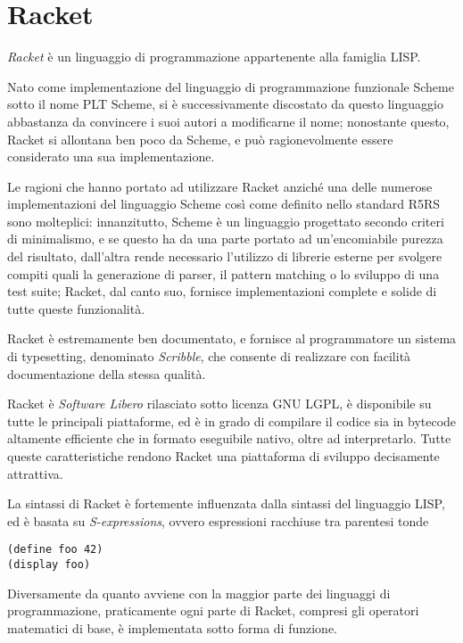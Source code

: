 \section{Racket}

\emph{Racket} \`e un linguaggio di programmazione appartenente alla
famiglia LISP.

Nato come implementazione del linguaggio di programmazione funzionale Scheme
sotto il nome PLT Scheme, si \`e successivamente discostato da questo
linguaggio abbastanza da convincere i suoi autori a modificarne il nome;
nonostante questo, Racket si allontana ben poco da Scheme, e pu\`o
ragionevolmente essere considerato una sua implementazione.

Le ragioni che hanno portato ad utilizzare Racket anzich\'e una delle
numerose implementazioni del linguaggio Scheme cos\`i come definito nello
standard R5RS sono molteplici: innanzitutto, Scheme \`e un linguaggio
progettato secondo criteri di minimalismo, e se questo ha da una parte
portato ad un'encomiabile purezza del risultato, dall'altra rende necessario
l'utilizzo di librerie esterne per svolgere compiti quali la generazione di
parser, il pattern matching o lo sviluppo di una test suite; Racket, dal
canto suo, fornisce implementazioni complete e solide di tutte queste
funzionalit\`a.

Racket \`e estremamente ben documentato, e fornisce al programmatore un
sistema di typesetting, denominato \emph{Scribble}, che consente di
realizzare con facilit\`a documentazione della stessa qualit\`a.

Racket \`e \emph{Software Libero} rilasciato sotto licenza GNU LGPL, \`e
disponibile su tutte le principali piattaforme, ed \`e in grado di compilare
il codice sia in bytecode altamente efficiente che in formato eseguibile
nativo, oltre ad interpretarlo. Tutte queste caratteristiche rendono Racket
una piattaforma di sviluppo decisamente attrattiva.

La sintassi di Racket \`e fortemente influenzata dalla sintassi del
linguaggio LISP, ed \`e basata su \emph{S-expressions}, ovvero espressioni
racchiuse tra parentesi tonde

\begin{lstlisting}
(define foo 42)
(display foo)
\end{lstlisting}

Diversamente da quanto avviene con la maggior parte dei linguaggi di
programmazione, praticamente ogni parte di Racket, compresi gli operatori
matematici di base, \`e implementata sotto forma di funzione.
